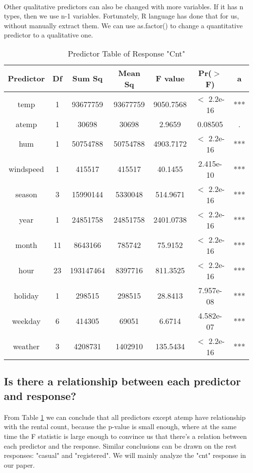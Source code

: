 \documentclass{article}[]
\begin{document}
\paragraph{}
Other qualitative predictors can also be changed with more variables. If it has n types, then we use n-1 variables. Fortunately, R language has done that for us, without manually extract them. We can use as.factor() to change a quantitative predictor to a qualitative one.

\begin{table}
\caption{Predictor Table of Response "Cnt"}
\centering
\begin{tabular}{c|c|c|c|c|c|c}
\hline
{\bf Predictor}&{\bf Df}&{\bf Sum Sq}&{\bf Mean Sq}&{\bf F value}&{\bf Pr($>$ F)}&{\bf a}\\
\hline
temp          &1  &93677759 &93677759 &9050.7568 &$<$ 2.2e-16 &***\\
atemp         &1     &30698    &30698    &2.9659   &0.08505 &.\\
hum           &1  &50754788 &50754788 &4903.7172 &$<$ 2.2e-16 &***\\
windspeed     &1    &415517   &415517   &40.1455 &2.415e-10 &***\\
season        &3  &15990144  &5330048  &514.9671 &$<$ 2.2e-16 &***\\
year          &1  &24851758 &24851758 &2401.0738 &$<$ 2.2e-16 &***\\
month        &11   &8643166   &785742   &75.9152 &$<$ 2.2e-16 &***\\
hour         &23 &193147464  &8397716  &811.3525 &$<$ 2.2e-16 &***\\
holiday       &1    &298515   &298515   &28.8413 &7.957e-08 &***\\
weekday       &6    &414305    &69051    &6.6714 &4.582e-07 &***\\
weather       &3   &4208731  &1402910  &135.5434 &$<$ 2.2e-16 &***\\
\hline
\end{tabular}
\label{table:predictor_table1}
\end{table}

\subsection{Is there a relationship between each predictor and response?}
\paragraph{}
From Table \ref{table:predictor_table1} we can conclude that all predictors except atemp have relationship with the rental count, because the p-value is small enough, where at the same time the F statistic is large enough to convince us that there's a relation between each predictor and the response. Similar conclusions can be drawn on the rest responses: "casual" and "registered". We will mainly analyze the "cnt" response in our paper.
\end{document}
